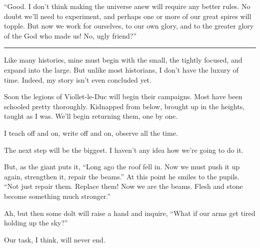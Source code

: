 ``Good. I don't think making the universe anew will require any better rules. No doubt we'll need to experiment, and perhaps one or more of our great spires will topple. But now we work for ourselves, to our own glory, and to the greater glory of the God who made us! No, ugly friend?''

\fancybreak{* * *}

Like many histories, mine must begin with the small, the tightly focused, and expand into the large. But unlike most historians, I don't have the luxury of time. Indeed, my story isn't even concluded yet.

Soon the legions of Viollet-le-Duc will begin their campaigns. Most have been schooled pretty thoroughly. Kidnapped from below, brought up in the heights, taught as I was. We'll begin returning them, one by one.

I teach off and on, write off and on, observe all the time.

The next step will be the biggest. I haven't any idea how we're going to do it.

But, as the giant puts it, ``Long ago the roof fell in. Now we must push it up again, strengthen it, repair the beams.'' At this point he smiles to the pupils. ``Not just repair them. Replace them! Now we are the beams. Flesh and stone become something much stronger.''

Ah, but then some dolt will raise a hand and inquire, ``What if our arms get tired holding up the sky?''

Our task, I think, will never end.